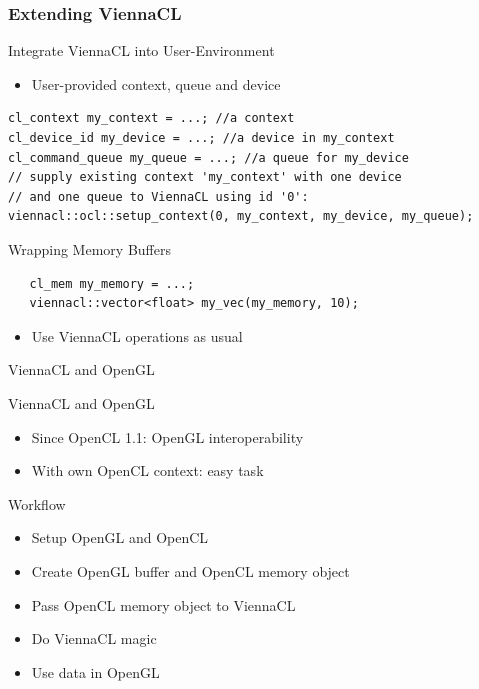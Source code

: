 \begin{frame}[fragile]
\frametitle{Extending ViennaCL}

\begin{block}{Integrate ViennaCL into User-Environment}
 \begin{itemize}
  \item User-provided context, queue and device
 \end{itemize}
\end{block}

  \begin{lstlisting}
cl_context my_context = ...; //a context
cl_device_id my_device = ...; //a device in my_context
cl_command_queue my_queue = ...; //a queue for my_device
// supply existing context 'my_context' with one device 
// and one queue to ViennaCL using id '0':
viennacl::ocl::setup_context(0, my_context, my_device, my_queue);
  \end{lstlisting}

\begin{block}{Wrapping Memory Buffers}
  \begin{lstlisting}
   cl_mem my_memory = ...;
   viennacl::vector<float> my_vec(my_memory, 10);
  \end{lstlisting}
 \begin{itemize}
  \item Use ViennaCL operations as usual
 \end{itemize}

\end{block}

\end{frame}



\begin{frame}{ViennaCL and OpenGL}

\begin{block}{ViennaCL and OpenGL}
  \begin{itemize}
    \item Since OpenCL 1.1: OpenGL interoperability
    \item With own OpenCL context: easy task
  \end{itemize}
\end{block}

\begin{block}{Workflow}
  \begin{itemize}
    \item Setup OpenGL and OpenCL
    \item Create OpenGL buffer and OpenCL memory object
    \item Pass OpenCL memory object to ViennaCL
    \item Do ViennaCL magic
    \item Use data in OpenGL
  \end{itemize}
\end{block}

\end{frame}




